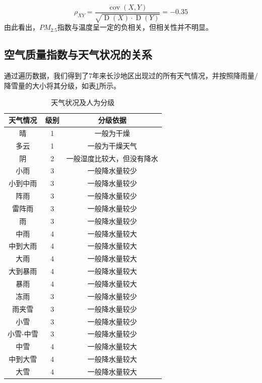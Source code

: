 \documentclass[UTF8,a4paper,10pt]{article}
\begin{document}
\begin{equation}
\rho_{XY} =  \frac{\operatorname{cov}(X, Y)}{\sqrt{\operatorname{D}(X) \cdot \operatorname{D}(Y)}} = -0.35
\end{equation}
\indent 由此看出，$PM_{2.5}$指数与温度呈一定的负相关，但相关性并不明显。

\subsection{空气质量指数与天气状况的关系}

\indent 通过遍历数据，我们得到了7年来长沙地区出现过的所有天气情况，并按照降雨量/降雪量的大小将其分级，如表\ref{table1}所示。

\begin{table}[]
    \caption{天气状况及人为分级}
    \vspace{20pt}
    \centering
    \begin{tabular}{ccc}
        \toprule  %
        天气情况& 级别& 分级依据\\
        \midrule  %
        晴& 1& 一般为干燥\\
        多云& 1& 一般为干燥天气\\
        阴& 2& 一般湿度比较大，但没有降水\\
        小雨& 3& 一般降水量较少\\
        小到中雨& 3& 一般降水量较少\\
        阵雨& 3& 一般降水量较少\\
        雷阵雨& 3& 一般降水量较少\\
        雨& 3& 一般降水量较少\\
        中雨& 4& 一般降水量较大\\
        中到大雨& 4& 一般降水量较大\\
        大雨& 4& 一般降水量较大\\
        大到暴雨& 4& 一般降水量较大\\
        暴雨& 4& 一般降水量较大\\
        冻雨& 3& 一般降水量较少\\
        雨夹雪& 3& 一般降水量较少\\
        小雪& 3& 一般降水量较少\\
        小雪-中雪& 3& 一般降水量较少\\
        中雪& 4& 一般降水量较大\\
        中到大雪& 4& 一般降水量较大\\
        大雪& 4& 一般降水量较大\\
        \bottomrule %
    \end{tabular}
    \label{table1}
\end{table}
\end{document}
